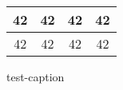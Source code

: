 \documentclass{article}
\begin{document}
\begin{figure}[t]
    \centering
\begin{tabular}{|| c | *{2}c | c ||}
\hline
\hline
  42 & 42 & 42 & 42 \\
\hline
  42 & 42 & 42 & 42 \\
\hline
\hline
\end{tabular}
  \caption{test-caption}
  \label{fig:test-label}
\end{figure}
\end{document}
